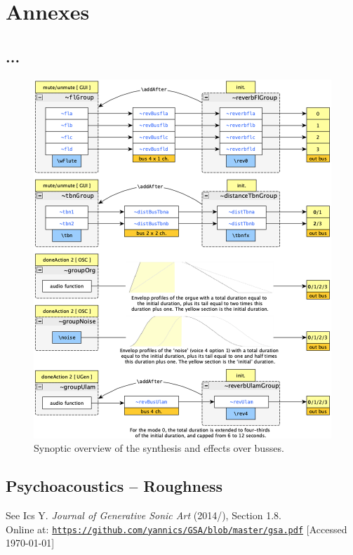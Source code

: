 \documentclass{article}
\begin{document}
%



\section*{Annexes}
\label{annexes}

\subsection*{...}

\begin{figure}[H]
\centering
\includegraphics[width=\textwidth-1mm]{../img/9940}
\caption*{Synoptic overview of the synthesis and effects over busses.}
\label{struc}
\end{figure}

\newpage

\subsection*{Psychoacoustics -- Roughness}

See Ics Y. \textit{Journal of Generative Sonic Art} (2014/\the\year), Section 1.8.\\ Online at: \href{https://github.com/yannics/GSA/blob/master/gsa.pdf}{\texttt{\small https://github.com/yannics/GSA/blob/master/gsa.pdf}} [Accessed \today]
\end{document}
